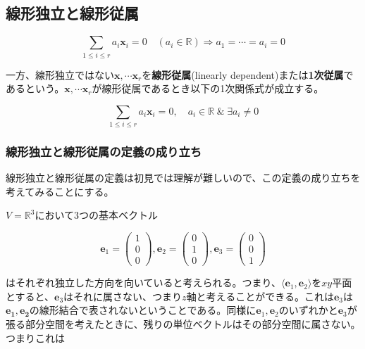 \documentclass[dvipdfmx,autodetect-engine]{jsarticle}
\theoremstyle{definition}
\newcommand{\vecSpace}[1]{\mathbb{R}^{#1}}
\begin{document}
\subsection{線形独立と線形従属}

\label{defi:linearlyIndependent}

$$
\sum_{1 \leq i \leq r} a_i\bm{x}_i = 0 \quad (a_i \in \mathbb{R}) \Longrightarrow a_1 = \cdots = a_i = 0
$$

一方、線形独立ではない$\bm{x}, \cdots \bm{x}_r$を{\bf 線形従属}(linearly dependent)または{\bf 1次従属}であるという。$\bm{x}, \cdots \bm{x}_r$が線形従属であるとき以下の1次関係式が成立する。

$$
\sum_{1 \leq i \leq r} a_i\bm{x}_i = 0, \quad a_i \in \mathbb{R} \hspace{3pt} \& \hspace{3pt} \exists a_i \neq 0
$$

\subsubsection{線形独立と線形従属の定義の成り立ち}

線形独立と線形従属の定義は初見では理解が難しいので、この定義の成り立ちを考えてみることにする。

$V = \vecSpace{3}$において3つの基本ベクトル

$$
\bm{e}_1 = \begin{pmatrix}
1 \\
0 \\
0
\end{pmatrix}, 
\bm{e}_2 = \begin{pmatrix}
0 \\
1 \\
0
\end{pmatrix}, 
\bm{e}_3 = \begin{pmatrix}
0 \\
0 \\
1
\end{pmatrix}
$$

はそれぞれ独立した方向を向いていると考えられる。つまり、$\langle \bm{e}_1, \bm{e}_2 \rangle$を$xy$平面とすると、$\bm{e}_3$はそれに属さない、つまり$z$軸と考えることができる。これは$\bm{e}_3$は$\bm{e_1}, \bm{e_2}$の線形結合で表されないということである。同様に$\bm{e}_1, \bm{e}_2$のいずれかと$\bm{e}_3$が張る部分空間を考えたときに、残りの単位ベクトルはその部分空間に属さない。つまりこれは
\end{document}
